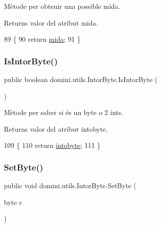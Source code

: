Mètode per obtenir una possible mida. 

\begin{DoxyReturn}{Returns}
valor del atribut mida. 
\end{DoxyReturn}

\begin{DoxyCode}
89    \{
90       \textcolor{keywordflow}{return} \hyperlink{classdomini_1_1utils_1_1IntorByte_a6dd2ad21efcfb2bcfff716f5e04794d9}{mida};
91    \}
\end{DoxyCode}
\mbox{\label{classdomini_1_1utils_1_1IntorByte_a4fcfaf967d0c82b8147d632da4e238d0}} 
\subsubsection{\texorpdfstring{Is\+Intor\+Byte()}{IsIntorByte()}}
{\footnotesize\ttfamily public boolean domini.\+utils.\+Intor\+Byte.\+Is\+Intor\+Byte (\begin{DoxyParamCaption}{ }\end{DoxyParamCaption})\hspace{0.3cm}{\ttfamily [inline]}}



Mètode per saber si és un byte o 2 int\textquotesingle{}s. 

\begin{DoxyReturn}{Returns}
valor del atribut intobyte. 
\end{DoxyReturn}

\begin{DoxyCode}
109    \{
110       \textcolor{keywordflow}{return} \hyperlink{classdomini_1_1utils_1_1IntorByte_aee013881ecae778d25cab7c0b7655528}{intobyte};
111    \}
\end{DoxyCode}
\mbox{\label{classdomini_1_1utils_1_1IntorByte_a02677743722d43ce96904e03eb82f25b}} 
\subsubsection{\texorpdfstring{Set\+Byte()}{SetByte()}}
{\footnotesize\ttfamily public void domini.\+utils.\+Intor\+Byte.\+Set\+Byte (\begin{DoxyParamCaption}\item[{byte}]{c }\end{DoxyParamCaption})\hspace{0.3cm}{\ttfamily [inline]}}



